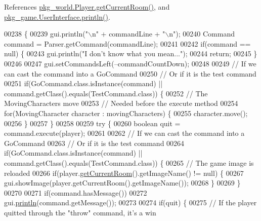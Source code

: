 References \hyperlink{Player_8java_source_l00105}{pkg\-\_\-world.\-Player.\-get\-Current\-Room()}, and \hyperlink{UserInterface_8java_source_l00083}{pkg\-\_\-game.\-User\-Interface.\-println()}.


\begin{DoxyCode}
00238                                                    \{
00239         gui.println(\textcolor{stringliteral}{"\(\backslash\)n"} + commandLine + \textcolor{stringliteral}{"\(\backslash\)n"});
00240         Command command = Parser.getCommand(commandLine);
00241 
00242         \textcolor{keywordflow}{if}(command == null) \{
00243             gui.println(\textcolor{stringliteral}{"I don't know what you mean..."});
00244             \textcolor{keywordflow}{return};
00245         \}
00246 
00247         gui.setCommandsLeft(--commandCountDown);
00248 
00249         \textcolor{comment}{// If we can cast the command into a GoCommand}
00250         \textcolor{comment}{// Or if it is the test command}
00251         \textcolor{keywordflow}{if}(GoCommand.class.isInstance(command) || command.getClass().equals(TestCommand.class)) \{
00252             \textcolor{comment}{// The MovingCharacters move}
00253             \textcolor{comment}{// Needed before the execute method}
00254             \textcolor{keywordflow}{for}(MovingCharacter character : movingCharacters) \{
00255                 character.move();
00256             \}
00257         \}
00258 
00259         \textcolor{keywordflow}{try} \{
00260             \textcolor{keywordtype}{boolean} quit = command.execute(player);
00261 
00262             \textcolor{comment}{// If we can cast the command into a GoCommand}
00263             \textcolor{comment}{// Or if it is the test command}
00264             \textcolor{keywordflow}{if}(GoCommand.class.isInstance(command) || command.getClass().equals(TestCommand.class)) \{
00265                 \textcolor{comment}{// The game image is reloaded}
00266                 \textcolor{keywordflow}{if}(player.\hyperlink{classpkg__world_1_1Player_a5ff0ede152d97c0c9cf6603c9a422a77}{getCurrentRoom}().getImageName() != null) \{
00267                     gui.showImage(player.getCurrentRoom().getImageName());
00268                 \}
00269             \}
00270 
00271             \textcolor{keywordflow}{if}(command.hasMessage())
00272                 gui.\hyperlink{classpkg__game_1_1UserInterface_ac4d82f989416d7cc64a6e2fba2f4ed75}{println}(command.getMessage());
00273 
00274             \textcolor{keywordflow}{if}(quit) \{
00275                 \textcolor{comment}{// If the player quitted through the "throw" command, it's a win}

\end{DoxyCode}
